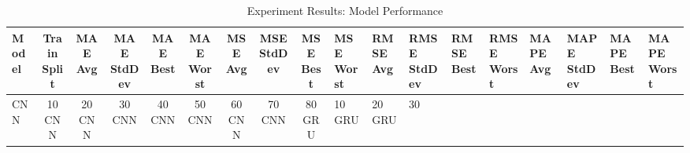\begin{table}
\caption{Experiment Results: Model Performance}
\label{tab:experiment_results}
\begin{tabular}{|l|c|c|c|c|c|c|c|c|}
\toprule
Model & Train Split & MAE Avg & MAE StdDev & MAE Best & MAE Worst & MSE Avg & MSE StdDev & MSE Best & MSE Worst & RMSE Avg & RMSE StdDev & RMSE Best & RMSE Worst & MAPE Avg & MAPE StdDev & MAPE Best & MAPE Worst \\
\midrule
CNN & 10%
CNN & 20%
CNN & 30%
CNN & 40%
CNN & 50%
CNN & 60%
CNN & 70%
CNN & 80%
GRU & 10%
GRU & 20%
GRU & 30%

\end{tabular}
\end{table}
